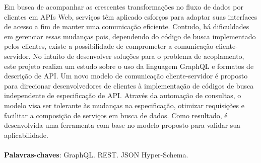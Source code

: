 \begin{resumo}
  Em busca de acompanhar as crescentes transformações no fluxo de dados por clientes em APIs Web, serviços têm aplicado esforços para adaptar suas interfaces de acesso a fim de manter uma comunicação eficiente. Contudo, há dificuldades em gerenciar essas mudanças pois, dependendo do código de busca implementado pelos clientes, existe a possibilidade de comprometer a comunicação cliente-servidor. No intuito de desenvolver soluções para o problema de acoplamento, este projeto realiza um estudo sobre o uso da linguagem GraphQL e formatos de descrição de API. Um novo modelo de comunicação cliente-servidor é proposto para direcionar desenvolvedores de clientes à implementação de códigos de busca independente de especificação de API. Através da automação de consultas, o modelo visa ser tolerante às mudanças na especificação, otimizar requisições e facilitar a composição de serviços em busca de dados. Como resultado, é desenvolvida uma ferramenta com base no modelo proposto para validar sua aplicabilidade. \\ \\
  \textbf{Palavras-chaves}: GraphQL. REST. JSON Hyper-Schema.
\end{resumo}